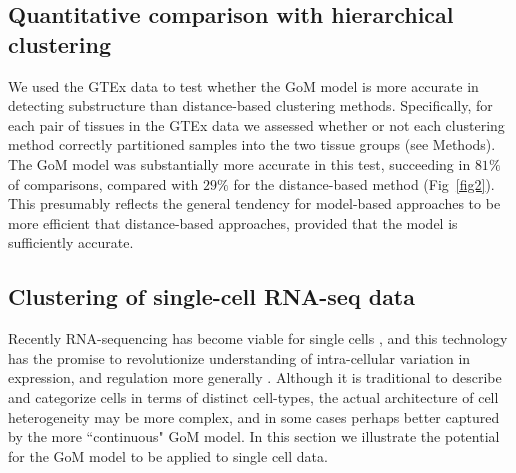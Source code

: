 \documentclass[10pt,letterpaper]{article}
\begin{document}
\subsection*{Quantitative comparison with hierarchical clustering}

We used the GTEx data to test whether the GoM model is more accurate in detecting substructure than distance-based clustering methods.
Specifically, for each pair of tissues in the GTEx data we assessed whether or not each clustering method
correctly partitioned samples into the two tissue groups (see Methods). The GoM model was substantially more accurate in this test, succeeding in $81 \%$ of comparisons, compared with $29 \%$ for the distance-based method (Fig~\ref{fig2}). This presumably reflects the general tendency for model-based
approaches to be more efficient that distance-based approaches, provided that the model is sufficiently accurate.



\subsection*{Clustering of single-cell RNA-seq data}

Recently RNA-sequencing has become viable for single cells \cite{Tang2009}, and this technology has the promise to revolutionize understanding of intra-cellular variation in expression, and regulation more generally \cite{Trapnell2015}. Although it is traditional to describe and categorize cells in terms of distinct cell-types,
the actual architecture of cell heterogeneity may be more complex, and in some cases perhaps better captured by the more ``continuous"  GoM model. In this section we illustrate the potential for the GoM model to be applied to single cell data.
\end{document}
